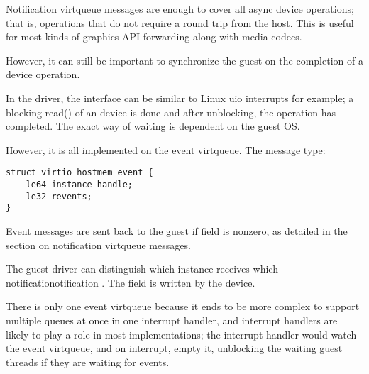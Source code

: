 Notification virtqueue messages are enough to cover all async device operations;
that is, operations that do not require a round trip from the host.
This is useful for most kinds of graphics API forwarding along
with media codecs.

However, it can still be important to synchronize the guest on the completion
of a device operation.

In the driver, the interface can be similar to Linux uio interrupts for example;
a blocking read() of an device is done and after unblocking,
the operation has completed.
The exact way of waiting is dependent on the guest OS.

However, it is all implemented on the event virtqueue. The message type:

\begin{lstlisting}
struct virtio_hostmem_event {
    le64 instance_handle;
    le32 revents;
}
\end{lstlisting}

Event messages are sent back to the guest if  field is nonzero,
as detailed in the section on notification virtqueue messages.

The guest driver can distinguish which instance receives which notificationotification
.
The field  is written by the device.

There is only one event virtqueue because it ends to be more complex to support
multiple queues at once in one interrupt handler,
and interrupt handlers are likely to play a role in most implementations;
the interrupt handler would watch the event virtqueue,
and on interrupt, empty it, unblocking the waiting guest threads if they are
waiting for events.
